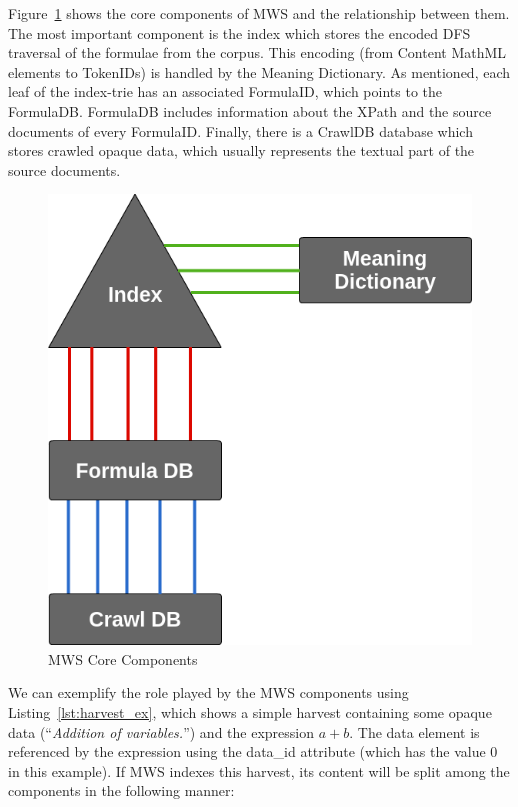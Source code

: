 \documentclass[a4paper,oneside]{article}
\def\MWS{\textsf{MWS}\xspace}
\def\cmml{\textsf{Content MathML}\xspace}
\def\xpath{\textsf{XPath}\xspace}
\begin{document}
Figure~\ref{fig:simple_index} shows the core components of \MWS and the
relationship between them. The most important component is the index which
stores the encoded DFS traversal of the formulae from the corpus. This encoding
(from \cmml elements to \textsf{TokenID}s) is handled by the Meaning
Dictionary. As mentioned, each leaf of the index-trie has an associated
\textsf{FormulaID}, which points to the \textsf{FormulaDB}. \textsf{FormulaDB}
includes information about the \xpath and the source documents of every
\textsf{FormulaID}. Finally, there is a \textsf{CrawlDB} database which stores
crawled opaque data, which usually represents the textual part of the source
documents.

\begin{figure}[ht]\centering
\includegraphics[scale=0.3]{img/simple_index.png}
\caption{MWS Core Components}\label{fig:simple_index}
\end{figure}
\FloatBarrier

We can exemplify the role played by the \MWS components using
Listing~\ref{lst:harvest_ex}, which shows a simple harvest containing some
opaque data (``\textit{Addition of variables.}'') and the expression $a+b$.
The data element is referenced by the expression using the \textsf{data\_id}
attribute (which has the value $0$ in this example).
If \MWS indexes this harvest, its content will be split among the
components in the following manner:
\end{document}

